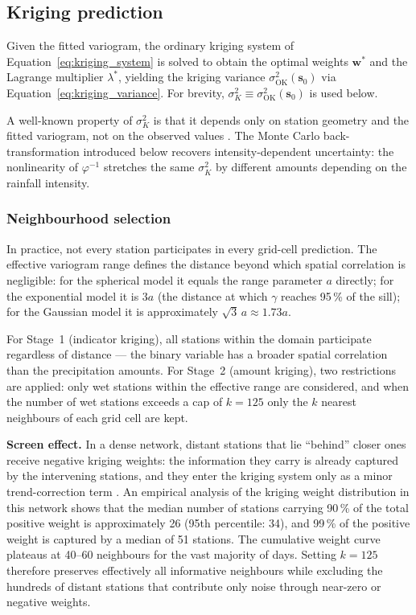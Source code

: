 \subsection{Kriging prediction}
\label{sec:kriging-mechanics}

Given the fitted variogram, the ordinary kriging system of
Equation~\eqref{eq:kriging_system} is solved to obtain the optimal weights
$\mathbf{w}^*$ and the Lagrange multiplier $\lambda^*$, yielding the
kriging variance $\sigma^2_{\text{OK}}(\mathbf{s}_0)$ via
Equation~\eqref{eq:kriging_variance}. For brevity, $\sigma^2_K \equiv
\sigma^2_{\text{OK}}(\mathbf{s}_0)$ is used below.

A well-known property of $\sigma^2_K$ is that it depends only on station
geometry and the fitted variogram, not on the observed values
\cite{journel1989fundamentals, haylock2008european}. The Monte Carlo
back-transformation introduced below recovers intensity-dependent
uncertainty: the nonlinearity of $\varphi^{-1}$ stretches the same
$\sigma^2_K$ by different amounts depending on the rainfall intensity.

\subsubsection{Neighbourhood selection}
\label{sec:kriging-neighbourhood}

In practice, not every station participates in every grid-cell prediction.
The effective variogram range defines the distance beyond which spatial
correlation is negligible: for the spherical model it equals the range
parameter $a$ directly; for the exponential model it is $3a$ (the distance
at which $\gamma$ reaches 95\,\% of the sill); for the Gaussian model it
is approximately $\sqrt{3}\,a \approx 1.73a$.

For Stage~1 (indicator kriging), all stations within the domain participate
regardless of distance — the binary variable has a broader spatial
correlation than the precipitation amounts. For Stage~2 (amount kriging),
two restrictions are applied: only wet stations within the effective
range are considered, and when the number of wet stations exceeds a cap
of $k = 125$ only the $k$ nearest neighbours of each grid cell are kept.

\textbf{Screen effect.}
In a dense network, distant stations that lie ``behind'' closer ones
receive negative kriging weights: the information they carry is already
captured by the intervening stations, and they enter the kriging system
only as a minor trend-correction term \cite{deutsch1998gslib}. An empirical
analysis of the kriging weight distribution in this network shows that the
median number of stations carrying 90\,\% of the total positive weight is
approximately 26 (95th percentile: 34), and 99\,\% of the positive weight
is captured by a median of 51 stations. The cumulative weight curve
plateaus at 40--60 neighbours for the vast majority of days. Setting
$k = 125$ therefore preserves effectively all informative neighbours
while excluding the hundreds of distant stations that contribute only
noise through near-zero or negative weights.

